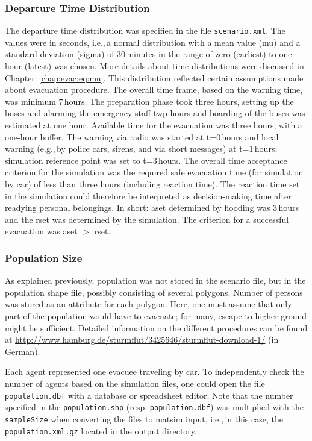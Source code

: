 \subsubsection{Departure Time Distribution}
The departure time distribution was specified in the file \lstinline|scenario.xml|. The values were in seconds, i.e.,\,a normal distribution with a mean value (mu) and a standard deviation (sigma) of 30\,minutes in the range of zero (earliest) to one hour (latest) was chosen. 
More details about time distributions were discussed in Chapter~\ref{chap:evac:eq:mu}. This distribution reflected certain assumptions made about evacuation procedure. The overall time frame, based on the warning time, was minimum 7\,hours. The preparation phase took three hours, setting up the buses and alarming the emergency staff twp hours and boarding of the buses was estimated at one hour. Available time for the evacuation was three hours, with a one-hour buffer. 
The warning via radio was started at t=0\,hours and local warning (e.g.,\,by police cars, sirens, and via short messages) at t=1\,hours; simulation reference point was set to t=3\,hours. The overall time acceptance criterion for the simulation was the required safe evacuation time (for simulation by car) of less than three hours (including reaction time). The reaction time set in the simulation could therefore be interpreted as decision-making time after readying personal belongings. In short: \gls{aset} determined by flooding was 3\,hours and the \gls{rset} was determined by the simulation. The criterion for a successful evacuation was \gls{aset} $>$ \gls{rset}.

\subsubsection{Population Size}
As explained previously, population was not stored in the scenario file, but in the population shape file, possibly consisting of several polygons. Number of persons was stored as an attribute for each polygon. Here, one must assume that only part of the population would have to evacuate; for many, escape to higher ground might be sufficient. Detailed information on the different procedures can be found at \url{http://www.hamburg.de/sturmflut/3425646/sturmflut-download-1/} (in German).

Each agent represented one evacuee traveling by car. To independently check the number of agents based on the simulation files, one could open the file \lstinline|population.dbf| with a database or spreadsheet editor. Note that the number specified in the \lstinline|population.shp| (resp. \lstinline|population.dbf|) was multiplied with the \lstinline|sampleSize| when converting the files to \gls{matsim} input, i.e.,\,in this case, the \lstinline|population.xml.gz| located in the output directory.

